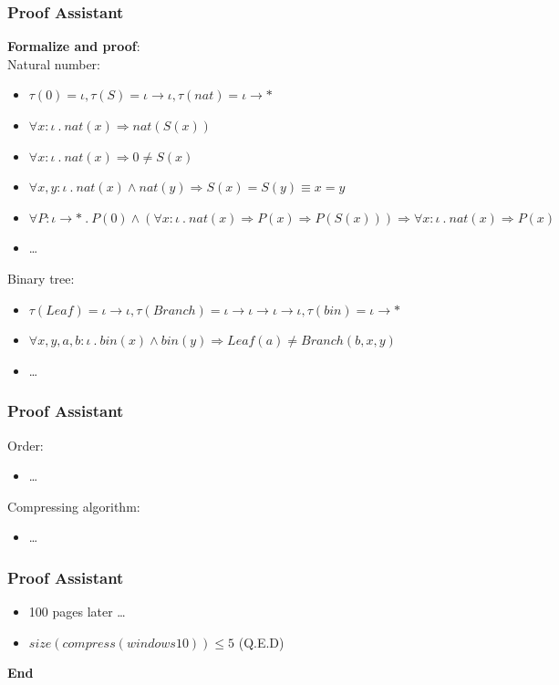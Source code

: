 \documentclass{beamer}
\newcommand*{\mdot}{\ensuremath{\ . \ }}
\begin{document}
  \begin{frame}
    \frametitle{Proof Assistant}
    \textbf{Formalize and proof}: \\
    Natural number:
    \begin{itemize}
      \item $\tau(0) = \iota, \tau(S) = \iota \rightarrow \iota, \tau(nat) = \iota \rightarrow *$
      \item $\forall x : \iota \mdot nat(x) \Rightarrow nat(S(x))$
      \item $\forall x : \iota \mdot nat(x) \Rightarrow  0 \neq S(x)$
      \item $\forall x, y : \iota \mdot nat(x) \land nat(y) \Rightarrow S(x) = S(y) \equiv x = y$
      \item $\forall P : \iota \rightarrow * \mdot P(0)
      \land (\forall x : \iota \mdot nat(x) \Rightarrow P(x) \Rightarrow P(S(x)))
      \Rightarrow \forall x : \iota \mdot nat(x) \Rightarrow P(x)$
      \item \ldots
    \end{itemize}
    Binary tree:
    \begin{itemize}
      \item $\tau(Leaf) = \iota \rightarrow \iota,
      \tau(Branch) = \iota \rightarrow \iota \rightarrow \iota \rightarrow \iota,
      \tau(bin) = \iota \rightarrow *$
      \item $\forall x, y, a, b : \iota \mdot bin(x) \land bin(y) \Rightarrow Leaf(a) \neq Branch(b, x, y)$
      \item \ldots
    \end{itemize}
  \end{frame}
  \begin{frame}
    \frametitle{Proof Assistant}
    Order:
    \begin{itemize}
      \item \ldots
    \end{itemize}
    Compressing algorithm:
    \begin{itemize}
      \item \ldots
    \end{itemize}
  \end{frame}
  \begin{frame}
    \frametitle{Proof Assistant}
    \begin{itemize}
      \item 100 pages later \ldots
      \item $size(compress(windows10)) \leq 5$ (Q.E.D)
    \end{itemize}
    \textbf{End} \\
  \end{frame}
\end{document}
